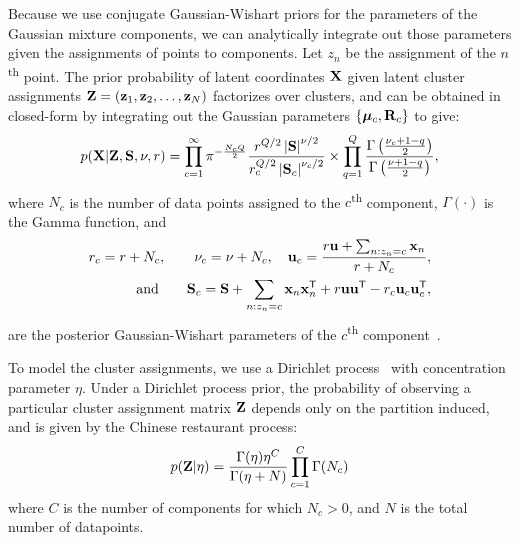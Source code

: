 Because we use conjugate Gaussian-Wishart priors for the parameters of the Gaussian mixture components, we can analytically integrate out those parameters given the assignments of points to components.
Let $z_n$ be the assignment of the $n$\textsuperscript{th} point.
The prior probability of latent coordinates $\mathbf{X}$ given latent cluster assignments $\mathbf{Z}=({\bf{z}}_1, {\bf{z}}_2, \ldots, {\bf{z}}_N)$ factorizes over clusters, and can be obtained in closed-form by integrating out the Gaussian parameters $\{{\boldsymbol{\mu}}_c, \mathbf{R}_c\}$ to give:
%
\begin{align}
p(\mathbf{X} | \mathbf{Z}, \mathbf{S}, \nu, r) = \prod_{c=1}^{\infty}
\pi^{-\frac{N_c Q}{2}}\frac{r^{Q/2} \left|\mathbf{S} \right|^{\nu/2}}{r_c^{Q/2} \left| \mathbf{S}_c \right|^{\nu_c/2}}
\times \prod_{q=1}^Q \frac{\Gamma \left( \frac{\nu_c + 1 - q}{2} \right)}{\Gamma \left( \frac{\nu+1-q}{2} \right)},
\label{eq:px_z}
\end{align}
%
where
$N_c$ is the number of data points assigned to the $c$\textsuperscript{th} component, $\Gamma(\cdot)$ is the Gamma function, and
%
\begin{align}
r_{c}=r+N_{c}, \hspace{2em}
\nu_{c}=\nu+N_{c}, 
\quad
\vu_c=\frac{r\vu + \sum_{n:z_n = c} \vx_n}{r+N_c}, \\
%
\textnormal{and} \qquad \vS_{c}=\vS+\sum_{n:z_{n}=c}\vx_{n}\vx_{n}\tra + r\vu\vu\tra
 - r_{c}\vu_{c}\vu_{c}\tra,
\end{align}
%
are the posterior Gaussian-Wishart parameters of the $c$\textsuperscript{th} component~\citep{murphy2007conjugate}.

To model the cluster assignments, we use a Dirichlet process~\citep{maceachern1998estimating} with concentration parameter $\eta$.
Under a Dirichlet process prior, the probability of observing a particular cluster assignment matrix $\mathbf{Z}$ depends only on the partition induced, and is given by the Chinese restaurant process:
%
\begin{align}
p(\mathbf{Z}|\eta) = 
\frac{\Gamma(\eta) \eta^C}{\Gamma(\eta + N)} \prod_{c=1}^C \Gamma( N_c )
\label{eq:pz}
\end{align}
%
where $C$ is the number of components for which $N_c > 0$, and $N$ is the total number of datapoints.

